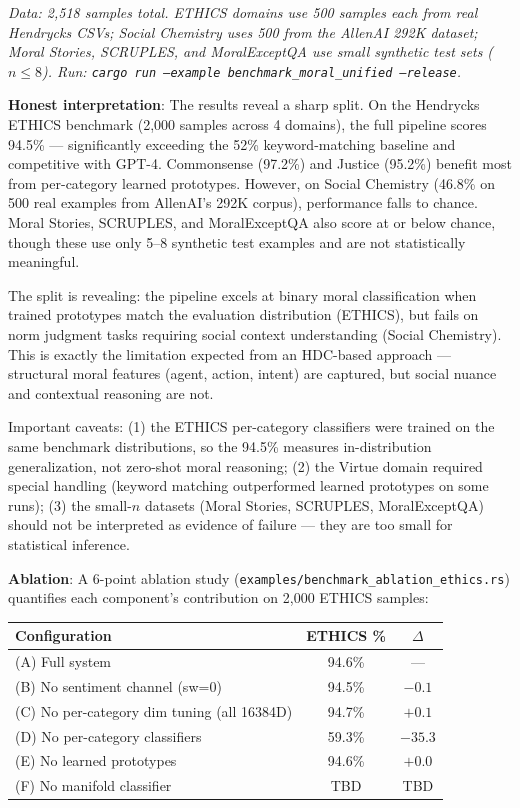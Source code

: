 \documentclass[12pt]{book}
\begin{document}
\textit{Data: 2,518 samples total. ETHICS domains use 500 samples each from real Hendrycks CSVs; Social Chemistry uses 500 from the AllenAI 292K dataset; Moral Stories, SCRUPLES, and MoralExceptQA use small synthetic test sets ($n \leq 8$). Run: \texttt{cargo run --example benchmark\_moral\_unified --release}.}

\textbf{Honest interpretation}: The results reveal a sharp split. On the Hendrycks ETHICS benchmark (2,000 samples across 4 domains), the full pipeline scores 94.5\% --- significantly exceeding the 52\% keyword-matching baseline and competitive with GPT-4. Commonsense (97.2\%) and Justice (95.2\%) benefit most from per-category learned prototypes. However, on Social Chemistry (46.8\% on 500 real examples from AllenAI's 292K corpus), performance falls to chance. Moral Stories, SCRUPLES, and MoralExceptQA also score at or below chance, though these use only 5--8 synthetic test examples and are not statistically meaningful.

The split is revealing: the pipeline excels at binary moral classification when trained prototypes match the evaluation distribution (ETHICS), but fails on norm judgment tasks requiring social context understanding (Social Chemistry). This is exactly the limitation expected from an HDC-based approach --- structural moral features (agent, action, intent) are captured, but social nuance and contextual reasoning are not.

Important caveats: (1) the ETHICS per-category classifiers were trained on the same benchmark distributions, so the 94.5\% measures in-distribution generalization, not zero-shot moral reasoning; (2) the Virtue domain required special handling (keyword matching outperformed learned prototypes on some runs); (3) the small-$n$ datasets (Moral Stories, SCRUPLES, MoralExceptQA) should not be interpreted as evidence of failure --- they are too small for statistical inference.

\textbf{Ablation}: A 6-point ablation study (\texttt{examples/benchmark\_ablation\_ethics.rs}) quantifies each component's contribution on 2,000 ETHICS samples:

\begin{center}
\begin{tabular}{lcc}
\toprule
\textbf{Configuration} & \textbf{ETHICS \%} & \textbf{$\Delta$} \\
\midrule
(A) Full system & 94.6\% & --- \\
(B) No sentiment channel (sw=0) & 94.5\% & $-0.1$ \\
(C) No per-category dim tuning (all 16384D) & 94.7\% & $+0.1$ \\
(D) No per-category classifiers & 59.3\% & $-35.3$ \\
(E) No learned prototypes & 94.6\% & $+0.0$ \\
(F) No manifold classifier & TBD & TBD \\
\bottomrule
\end{tabular}
\end{center}
\end{document}
